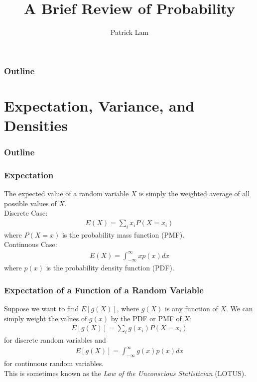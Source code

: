\documentclass{beamer}
\author{Patrick Lam}
\title{A Brief Review of Probability}
\date{}
\begin{document}
\newcommand{\red}{\textcolor{red}}
\newcommand{\blue}{\textcolor{blue}}
\newcommand{\purple}{\textcolor{purple}}

\frame{\titlepage}

\begin{frame}
\frametitle{Outline}
\tableofcontents
\end{frame}



\section{Expectation, Variance, and Densities}


\begin{frame}
\frametitle{Outline}
\tableofcontents[currentsection]
\end{frame}

\begin{frame}
\frametitle{Expectation}
\pause
The expected value of a random variable $X$ is simply the weighted
average of all possible values of $X$.\\
\bigskip
\pause
Discrete Case:
\pause
\begin{eqnarray*}
E(X) = \sum_i x_i P(X = x_i)
\end{eqnarray*}
where $P(X = x)$ is the probability mass function (PMF).\\
\pause
\bigskip
Continuous Case:
\pause
\begin{eqnarray*}
E(X) = \int^{\infty}_{-\infty} x p(x) dx
\end{eqnarray*}
where $p(x)$ is the probability density function (PDF).
\end{frame}

\begin{frame}
\frametitle{Expectation of a Function of a Random Variable}
\pause
Suppose we want to find $E[g(X)]$, where $g(X)$ is any function of
$X$.  \pause  We can simply weight the values of $g(x)$ by the PDF or
PMF of $X$:
\pause
\begin{eqnarray*}
E[g(X)] = \sum_i g(x_i) P(X = x_i)
\end{eqnarray*}
for discrete random variables \pause and 
\begin{eqnarray*}
E[g(X)] = \int_{-\infty}^{\infty} g(x) p(x) dx
\end{eqnarray*}
for continuous random variables.  \\
\bigskip
\pause
This is sometimes known as the \textit{Law of the Unconscious
Statistician} (LOTUS).
\end{frame}
\end{document}
